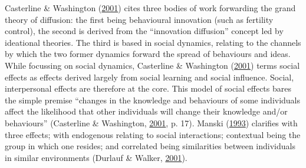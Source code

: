 \documentclass[12pt,twoside]{reedthesis}
\begin{document}
Casterline \& Washington (\protect\hyperlink{ref-casterline2001}{2001}) cites three bodies of work forwarding the grand theory of diffusion: the first being behavioural innovation (such as fertility control), the second is derived from the ``innovation diffusion'' concept led by ideational theories. The third is based in social dynamics, relating to the channels by which the two former dynamics forward the spread of behaviours and ideas. While focussing on social dynamics, Casterline \& Washington (\protect\hyperlink{ref-casterline2001}{2001}) terms social effects as effects derived largely from social learning and social influence. Social, interpersonal effects are therefore at the core. This model of social effects bares the simple premise ``changes in the knowledge and behaviours of some individuals affect the likelihood that other individuals will change their knowledge and/or behaviours'' (Casterline \& Washington, \protect\hyperlink{ref-casterline2001}{2001}, p. 17). Manski (\protect\hyperlink{ref-manski1993}{1993}) clarifies with three effects; with endogenous relating to social interactions; contextual being the group in which one resides; and correlated being similarities between individuals in similar environments (Durlauf \& Walker, \protect\hyperlink{ref-durlauf2001}{2001}).
\end{document}
